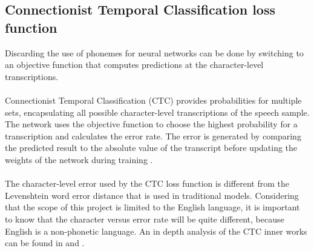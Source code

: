 \subsection{Connectionist Temporal Classification loss function}
 Discarding the use of phonemes for neural networks can be done by switching to an
 objective function that computes predictions at the character-level transcriptions.\\\\
Connectionist Temporal Classification (CTC) provides probabilities for multiple sets, encapsulating all possible character-level transcriptions of the speech sample.
The network uses the objective function to choose the highest probability for a transcription and calculates the error rate. The error is generated by comparing the
predicted result to the absolute value of the transcript before updating the weights of the network during training \cite{Great}.\\\\
The character-level error used by the CTC loss function is different from the Levenshtein \cite{stratonovich1960conditional} word error distance that is used in traditional models. Considering that the scope of this project is limited to the English language, it is important to know
that the character versus error rate will be quite different, because English is a non-phonetic language. An in depth analysis of the CTC inner works can be found in \cite{CTC1} and \cite{CTC2}. 